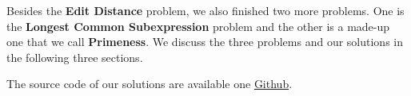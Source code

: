 Besides the {\bf Edit Distance} problem, we also finished two more problems.
One is the {\bf Longest Common Subexpression} problem and the other is
a made-up one that we call {\bf Primeness}. We discuss the three problems
and our solutions in the following three sections.

The source code of our solutions are available one
\href{https://github.com/jzhou76/csc481-project}{Github}.
